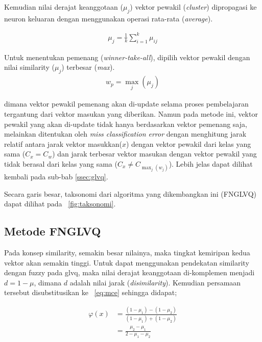 Kemudian nilai derajat keanggotaan ($\mu_{j}$) vektor pewakil
(\emph{cluster}) dipropagasi ke neuron keluaran dengan menggunakan operasi
rata-rata (\emph{average}).

\begin{align}
	\mu_j = \frac{1}{k} \sum_{i=1}^k \mu_{ij} 
\end{align}

Untuk menentukan pemenang (\emph{winner-take-all}), dipilih vektor
pewakil dengan nilai similarity ($\mu_j$) terbesar (\emph{max}).  
\begin{align}
	w_p = \max_j ( \mu_j )
\end{align}

dimana vektor pewakil pemenang akan di-update selama proses pembelajaran 
tergantung dari vektor masukan yang diberikan. Namun pada metode ini, vektor
pewakil yang akan di-update tidak hanya berdasarkan vektor pemenang saja,
melainkan ditentukan oleh \emph{miss classification error} dengan menghitung
jarak relatif antara jarak vektor masukkan($x$) dengan vektor pewakil dari
kelas yang sama ($C_x = C_w$) dan jarak terbesar vektor masukan dengan vektor
pewakil yang tidak berasal dari kelas yang sama ($C_x \neq C_{\max_{j}(w_j)}$).
Lebih jelas dapat dilihat kembali pada sub-bab \ref{ssec:glvq}.

Secara garis besar, taksonomi dari algoritma yang dikembangkan ini (FNGLVQ)
dapat dilihat pada \pic~\ref{fig:taksonomi}.
 

\subsection{Metode FNGLVQ}
Pada konsep similarity, semakin besar nilainya, maka tingkat kemiripan kedua
vektor akan semakin tinggi. Untuk dapat menggunakan pendekatan similarity dengan
fuzzy pada \gls{glvq},  maka nilai derajat keanggotaan di-komplemen menjadi $d =
1 - \mu$, dimana $d$ adalah nilai jarak (\emph{disimilarity}). Kemudian persamaan
tersebut disubstitusikan ke \equ~\ref{eq:mce} sehingga didapat;

\begin{align}
\label{eq:mcesim}
	\varphi(x) &= \frac{(1 - \mu_1) - (1 - \mu_2)}{(1 - \mu_1) + (1 -
	\mu_2)}\nonumber\\
	&= \frac{\mu_2 - \mu_1}{2 - \mu_1 - \mu_2}
\end{align}

